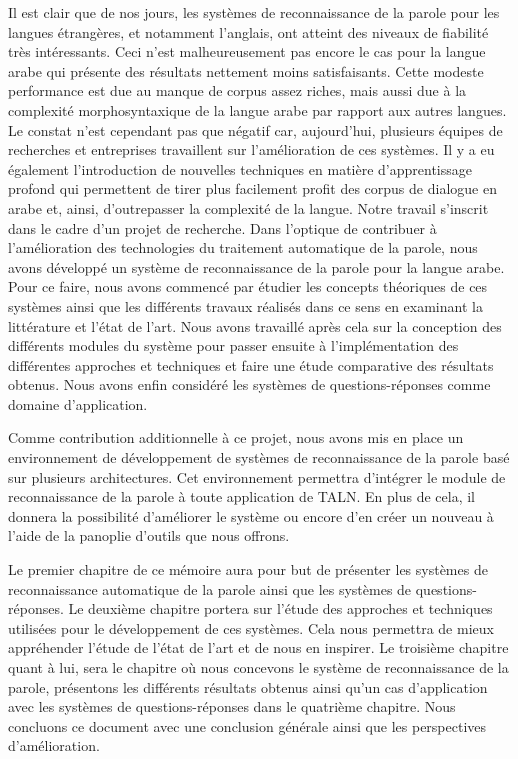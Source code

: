 Il est clair que de nos jours, les systèmes de reconnaissance de la parole pour les langues étrangères, et notamment l'anglais, ont atteint des niveaux de fiabilité très intéressants. Ceci n'est malheureusement pas encore le cas pour la langue arabe qui présente des résultats nettement moins satisfaisants. Cette modeste performance est due au manque de corpus assez riches, mais aussi due à la complexité morphosyntaxique de la langue arabe par rapport aux autres langues. Le constat n'est cependant pas que négatif car, aujourd'hui, plusieurs équipes de recherches et entreprises travaillent sur l'amélioration de ces systèmes. Il y a eu également l'introduction de nouvelles techniques en matière d'apprentissage profond qui permettent de tirer plus facilement profit des corpus de dialogue en arabe et, ainsi, d'outrepasser la complexité de la langue. 
\newpage
Notre travail s'inscrit dans le cadre d'un projet de recherche. Dans l'optique de contribuer à l'amélioration des technologies du traitement automatique de la parole, nous avons développé un système de reconnaissance de la parole pour la langue arabe. Pour ce faire, nous avons commencé par étudier les concepts théoriques de ces systèmes ainsi que les différents travaux réalisés dans ce sens en examinant la littérature et l'état de l'art. Nous avons travaillé après cela sur la conception des différents modules du système pour passer ensuite à l'implémentation des différentes approches et techniques et faire une étude comparative des résultats obtenus. Nous avons enfin considéré les systèmes de questions-réponses comme domaine d'application. 

Comme contribution additionnelle à ce projet, nous avons mis en place un environnement de développement de systèmes de reconnaissance de la parole basé sur plusieurs architectures. Cet environnement permettra d'intégrer le module de reconnaissance de la parole à toute application de TALN. En plus de cela, il donnera la possibilité d'améliorer le système ou encore d'en créer un nouveau à l'aide de la panoplie d'outils que nous offrons.

Le premier chapitre de ce mémoire aura pour but de présenter les systèmes de reconnaissance automatique de la parole ainsi que les systèmes de questions-réponses. Le deuxième chapitre portera sur l'étude des approches et techniques utilisées pour le développement de ces systèmes. Cela nous permettra de mieux appréhender l'étude de l'état de l'art et de nous en inspirer. Le troisième chapitre quant à lui, sera le chapitre où nous concevons le système de reconnaissance de la parole, présentons les différents résultats obtenus ainsi qu'un cas d'application avec les systèmes de questions-réponses dans le quatrième chapitre. Nous concluons ce document avec une conclusion générale ainsi que les perspectives d'amélioration.
